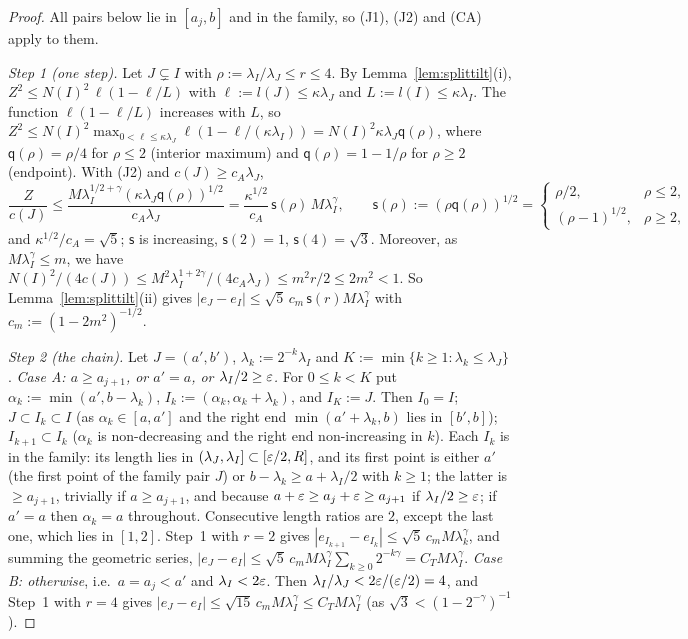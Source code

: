\begin{proof}
All pairs below lie in $[a_j,b]$ and in the family, so (J1), (J2) and (CA) apply to them.

\emph{Step 1 (one step).} Let $J\subsetneq I$ with $\rho:=\lambda_I/\lambda_J\le r\le4$. By
Lemma~\ref{lem:splittilt}(i), $Z^2\le N(I)^2\,\ell(1-\ell/L)$ with $\ell:=l(J)\le\kappa\lambda_J$ and
$L:=l(I)\le\kappa\lambda_I$. The function $\ell(1-\ell/L)$ increases with $L$, so
$Z^2\le N(I)^2\max_{0<\ell\le\kappa\lambda_J}\ell(1-\ell/(\kappa\lambda_I))=N(I)^2\kappa\lambda_J\mathsf q(\rho)$, where
$\mathsf q(\rho)=\rho/4$ for $\rho\le2$ (interior maximum) and $\mathsf q(\rho)=1-1/\rho$ for $\rho\ge2$ (endpoint).
With (J2) and $c(J)\ge c_A\lambda_J$,
\[
\frac Z{c(J)}\le\frac{M\lambda_I^{1/2+\gamma}(\kappa\lambda_J\mathsf q(\rho))^{1/2}}{c_A\lambda_J}
=\frac{\kappa^{1/2}}{c_A}\,\mathsf s(\rho)\,M\lambda_I^\gamma,\qquad \mathsf s(\rho):=(\rho\mathsf q(\rho))^{1/2}
=\begin{cases}\rho/2,&\rho\le2,\\(\rho-1)^{1/2},&\rho\ge2,\end{cases}
\]
and $\kappa^{1/2}/c_A=\sqrt5$; $\mathsf s$ is increasing, $\mathsf s(2)=1$, $\mathsf s(4)=\sqrt3$. Moreover, as
$M\lambda_I^\gamma\le m$, we have $N(I)^2/(4c(J))\le M^2\lambda_I^{1+2\gamma}/(4c_A\lambda_J)\le m^2r/2\le2m^2<1$. So
Lemma~\ref{lem:splittilt}(ii) gives $|e_J-e_I|\le\sqrt5\,c_m\,\mathsf s(r)M\lambda_I^\gamma$ with
$c_m:=(1-2m^2)^{-1/2}$.

\emph{Step 2 (the chain).} Let $J=(a',b')$, $\lambda_k:=2^{-k}\lambda_I$ and $K:=\min\{k\ge1:\lambda_k\le\lambda_J\}$.
\emph{Case A: $a\ge a_{j+1}$, or $a'=a$, or $\lambda_I/2\ge\varepsilon$.} For $0\le k<K$ put $\alpha_k:=\min(a',b-\lambda_k)$,
$I_k:=(\alpha_k,\alpha_k+\lambda_k)$, and $I_K:=J$. Then $I_0=I$; $J\subset I_k\subset I$ (as $\alpha_k\in[a,a']$ and the
right end $\min(a'+\lambda_k,b)$ lies in $[b',b]$); $I_{k+1}\subset I_k$ ($\alpha_k$ is non-decreasing and the right
end non-increasing in $k$). Each $I_k$ is in the family: its length lies in $(\lambda_J,\lambda_I]\subset[\varepsilon/2,R]$,
and its first point is either $a'$ (the first point of the family pair $J$) or $b-\lambda_k\ge a+\lambda_I/2$ with
$k\ge1$; the latter is $\ge a_{j+1}$, trivially if $a\ge a_{j+1}$, and because $a+\varepsilon\ge a_j+\varepsilon\ge a_{j+1}$ if
$\lambda_I/2\ge\varepsilon$; if $a'=a$ then $\alpha_k=a$ throughout. Consecutive length ratios are $2$, except the last one,
which lies in $[1,2]$. Step~1 with $r=2$ gives $|e_{I_{k+1}}-e_{I_k}|\le\sqrt5\,c_m M\lambda_k^\gamma$, and summing
the geometric series,
$|e_J-e_I|\le\sqrt5\,c_m M\lambda_I^\gamma\sum_{k\ge0}2^{-k\gamma}=C_TM\lambda_I^\gamma$.
\emph{Case B: otherwise}, i.e.\ $a=a_j<a'$ and $\lambda_I<2\varepsilon$. Then $\lambda_I/\lambda_J<2\varepsilon/(\varepsilon/2)=4$, and
Step~1 with $r=4$ gives $|e_J-e_I|\le\sqrt{15}\,c_m M\lambda_I^\gamma\le C_TM\lambda_I^\gamma$ (as
$\sqrt3<(1-2^{-\gamma})^{-1}$).


\end{proof}
